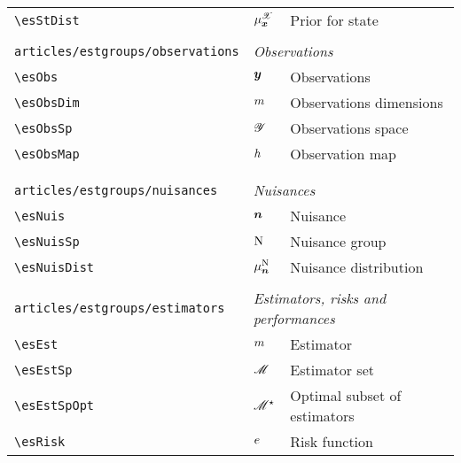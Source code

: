 \begin{longtable}{lll}
 {\color[rgb]{0.5,0.5,0.5}\texttt{\textbackslash esStDist}} & $\mu^{\mathscr{X}}_{\boldsymbol{x}}$ &  Prior for state\\ 
  &  & \\ 
 {\color[rgb]{0.5,0.5,0.5}\texttt{articles/estgroups/observations}} & \multicolumn{2}{l}{\emph{Observations}}\\ 
 \hline
{\color[rgb]{0.5,0.5,0.5}\texttt{\textbackslash esObs}} & $\boldsymbol{y}$ &  Observations\\ 
 {\color[rgb]{0.5,0.5,0.5}\texttt{\textbackslash esObsDim}} & $m$ &  Observations dimensions\\ 
 {\color[rgb]{0.5,0.5,0.5}\texttt{\textbackslash esObsSp}} & $\mathscr{Y}$ &  Observations space\\ 
 {\color[rgb]{0.5,0.5,0.5}\texttt{\textbackslash esObsMap}} & $h$ &  Observation map\\ 
  &  & {\setlength\fboxsep{1pt}%
\fbox{%
\color[rgb]{0.5,0.5,0.5}\begin{minipage}[]{8cm}%
$\esObs = \esNuis \esObsMap(\esSt)$\par%
{\small{\texttt{\$\textbackslash esObs = \textbackslash esNuis \textbackslash esObsMap(\textbackslash esSt)\$}}}\end{minipage}%
}%
}%
\\ 
  &  & \\ 
 {\color[rgb]{0.5,0.5,0.5}\texttt{articles/estgroups/nuisances}} & \multicolumn{2}{l}{\emph{Nuisances}}\\ 
 \hline
{\color[rgb]{0.5,0.5,0.5}\texttt{\textbackslash esNuis}} & $\boldsymbol{n}$ &  Nuisance\\ 
 {\color[rgb]{0.5,0.5,0.5}\texttt{\textbackslash esNuisSp}} & $\mathrm{N}$ &  Nuisance group\\ 
 {\color[rgb]{0.5,0.5,0.5}\texttt{\textbackslash esNuisDist}} & $\mu^{\mathrm{N}}_{\boldsymbol{n}}$ &  Nuisance distribution\\ 
  &  & \\ 
 {\color[rgb]{0.5,0.5,0.5}\texttt{articles/estgroups/estimators}} & \multicolumn{2}{l}{\emph{Estimators, risks and performances}}\\ 
 \hline
{\color[rgb]{0.5,0.5,0.5}\texttt{\textbackslash esEst}} & $m$ &  Estimator\\ 
 {\color[rgb]{0.5,0.5,0.5}\texttt{\textbackslash esEstSp}} & $\mathscr{M}$ &  Estimator set\\ 
 {\color[rgb]{0.5,0.5,0.5}\texttt{\textbackslash esEstSpOpt}} & $\mathscr{M}^\star$ &  Optimal subset of estimators\\ 
 {\color[rgb]{0.5,0.5,0.5}\texttt{\textbackslash esRisk}} & $e$ &  Risk function\\ 

\end{longtable}
